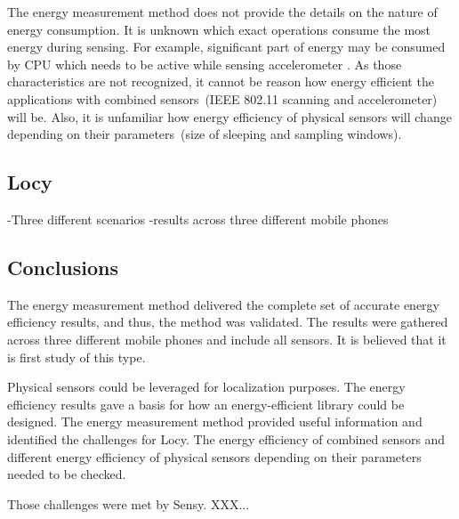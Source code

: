 The energy measurement method does not provide the details on the nature of energy consumption. It is unknown which exact operations consume the most energy during sensing. For example, significant part of energy may be consumed by CPU which needs to be active while sensing accelerometer \cite{priyantha:littlerock}. As those characteristics are not recognized, it cannot be reason how energy efficient the applications with combined sensors\ (IEEE 802.11 scanning and accelerometer) will be. Also, it is unfamiliar how energy efficiency of physical sensors will change depending on their parameters\ (size of sleeping and sampling windows).
						
\subsection{Locy}
-Three different scenarios
-results across three different mobile phones



\subsection{Conclusions}
The energy measurement method delivered the complete set of accurate energy efficiency results, and thus, the method was validated. The results were gathered across three different mobile phones and include all sensors. It is believed that it is first study of this type. 

Physical sensors could be leveraged for localization purposes. The energy efficiency results gave a basis for how an energy-efficient library could be designed. The energy measurement method provided useful information and identified the challenges for Locy. The energy efficiency of combined sensors and different energy efficiency of physical sensors depending on their parameters needed to be checked. 

Those challenges were met by Sensy. XXX...